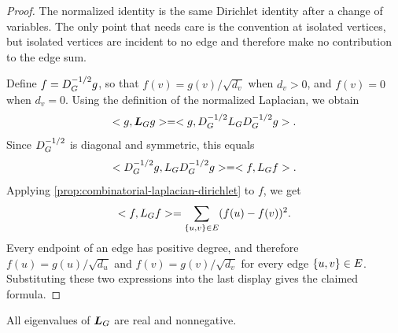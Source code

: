 \begin{proof}
	The normalized identity is the same Dirichlet identity after a change of variables. The only point that needs care is the convention at isolated vertices, but isolated vertices are incident to no edge and therefore make no contribution to the edge sum.

	Define \(f=D_{G}^{-1/2}g\), so that \(f(v)=g(v)/\sqrt{d_v}\) when \(d_v>0\), and \(f(v)=0\) when \(d_v=0\). Using the definition of the normalized Laplacian, we obtain
	\begin{equation}
		< g,\boldsymbol{L}_{G}g>
		=
		< g,D_{G}^{-1/2}L_{G}D_{G}^{-1/2}g>.
	\end{equation}
	Since \(D_{G}^{-1/2}\) is diagonal and symmetric, this equals
	\begin{equation}
		< D_{G}^{-1/2}g,L_{G}D_{G}^{-1/2}g>
		=
		< f,L_{G}f>.
	\end{equation}
	Applying \cref{prop:combinatorial-laplacian-dirichlet} to \(f\), we get
	\begin{equation}
		< f,L_{G}f>=\sum_{\{u,v\}\in E}(f(u)-f(v))^2.
	\end{equation}
	Every endpoint of an edge has positive degree, and therefore \(f(u)=g(u)/\sqrt{d_u}\) and \(f(v)=g(v)/\sqrt{d_v}\) for every edge \(\{u,v\}\in E\). Substituting these two expressions into the last display gives the claimed formula.
\end{proof}

\begin{corollary}
	\label{cor:laplacian-spectrum-nonnegative}
	All eigenvalues of \(\boldsymbol{L}_{G}\) are real and nonnegative.
\end{corollary}

